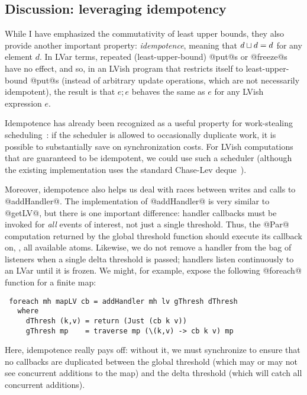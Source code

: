 \subsection{Discussion: leveraging idempotency}\label{subsection:lvish-discussion-leveraging-idempotency}

While I have emphasized the commutativity of least upper bounds, they
also provide another important property: \emph{idempotence}, meaning
that $d \sqcup d = d$ for any element $d$.  In LVar terms,
repeated (least-upper-bound) @put@s or @freeze@s have no effect, and
so, in an LVish program that restricts itself to least-upper-bound
@put@s (instead of arbitrary update operations, which are not
necessarily idempotent), the result is that $e; e$ behaves the same as
$e$ for any LVish expression $e$.

Idempotence has already been recognized as a useful property for
work-stealing scheduling~\cite{idempotent}: if the scheduler is
allowed to occasionally duplicate work, it is possible to
substantially save on synchronization costs.  For LVish computations
that are guaranteed to be idempotent, we could use such a scheduler
(although the existing implementation uses the standard Chase-Lev
deque~\cite{ChaseLev}).

Moreover, idempotence also helps us deal with races between writes and
calls to @addHandler@.  The implementation of @addHandler@ is very
similar to @getLV@, but there is one important difference: handler
callbacks must be invoked for \emph{all} events of interest, not just
a single threshold.  Thus, the @Par@ computation returned by the
global threshold function should execute its callback on, \eg, all
available atoms.  Likewise, we do not remove a handler from the bag of
listeners when a single delta threshold is passed; handlers listen
continuously to an LVar until it is frozen.  We might, for example,
expose the following @foreach@ function for a finite map:

\singlespacing
\begin{lstlisting}
 foreach mh mapLV cb = addHandler mh lv gThresh dThresh
   where
     dThresh (k,v) = return (Just (cb k v))
     gThresh mp    = traverse mp (\(k,v) -> cb k v) mp
\end{lstlisting}
\doublespacing

Here, idempotence really pays off: without it, we must synchronize to
ensure that no callbacks are duplicated between the global threshold
(which may or may not see concurrent additions to the map) and the
delta threshold (which will catch all concurrent additions).

